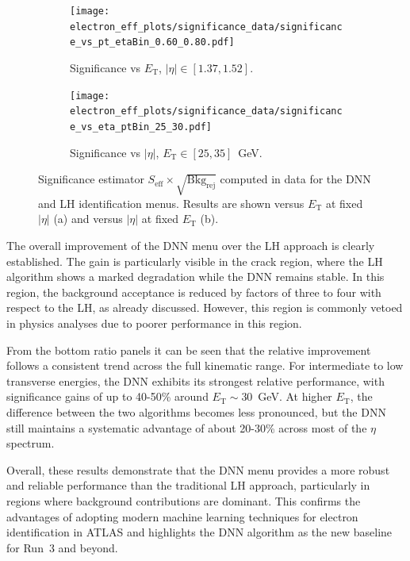 \begin{figure}[htbp]
  \centering

  \begin{subfigure}{0.48\textwidth}
    \centering
    \texttt{[image: electron\_eff\_plots/significance\_data/significance\_vs\_pt\_etaBin\_0.60\_0.80.pdf]}
    \caption{\small{Significance vs $E_{\mathrm{T}}$, $|\eta|\in[1.37,1.52]$.}}
    \label{fig:significance_vs_pt_etaBin}
  \end{subfigure}\hfill
  \begin{subfigure}{0.48\textwidth}
    \centering
    \texttt{[image: electron\_eff\_plots/significance\_data/significance\_vs\_eta\_ptBin\_25\_30.pdf]}
    \caption{\small{Significance vs $|\eta|$, $E_{\mathrm{T}}\in[25,35]$~GeV.}}
    \label{fig:significance_vs_eta_ptBin}
  \end{subfigure}

  \caption{Significance estimator $S_{\mathrm{eff}} \times \sqrt{\mathrm{Bkg}_{\mathrm{rej}}}$ 
  computed in data for the DNN and LH identification menus. 
  Results are shown versus $E_{\mathrm{T}}$ at fixed $|\eta|$ (a) and versus $|\eta|$ at fixed $E_{\mathrm{T}}$ (b).}
  \label{fig:significance_bins}
\end{figure}


The overall improvement of the DNN menu over the LH approach is clearly established. 
The gain is particularly visible in the crack region, where the LH algorithm shows a marked degradation while the DNN remains stable. 
In this region, the background acceptance is reduced by factors of three to four with respect to the LH, as already discussed. However, this region is commonly vetoed in physics analyses due to poorer performance in this region.

From the bottom ratio panels it can be seen that the relative improvement follows a consistent trend across the full kinematic range. 
For intermediate to low transverse energies, the DNN exhibits its strongest relative performance, with significance gains of up to 40-50\% around $E_{\mathrm{T}} \sim 30$~GeV. 
At higher $E_{\mathrm{T}}$, the difference between the two algorithms becomes less pronounced, but the DNN still maintains a systematic advantage of about 20-30\% across most of the $\eta$ spectrum. 

Overall, these results demonstrate that the DNN menu provides a more robust and reliable performance than the traditional LH approach, 
particularly in regions where background contributions are dominant. 
This confirms the advantages of adopting modern machine learning techniques for electron identification in ATLAS and 
highlights the DNN algorithm as the new baseline for Run~3 and beyond.

